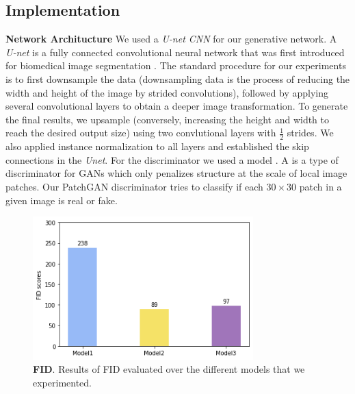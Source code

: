 \documentclass[10pt,twocolumn,letterpaper]{article}
\begin{document}
\subsection{Implementation}
\textbf{Network Architucture} We used a \textit{U-net CNN} for our generative network. A \textit{U-net} is a fully connected convolutional neural network that was first introduced for biomedical image segmentation \cite{unet}. The standard procedure for our experiments is to first downsample the data (downsampling data is the process of reducing the width and height of the image by strided convolutions), followed by applying several convolutional layers to obtain a deeper image transformation. To generate the final results, we upsample (conversely, increasing the height and width to reach the desired output size) using two convlutional layers with $\frac{1}{2}$ strides. We also applied instance normalization \cite{insnorm} to all layers and established the skip connections in the \textit{Unet}. For the discriminator we used a  model \cite{patchgan}. A is a type of discriminator for GANs which only penalizes structure at the scale of local image patches. Our PatchGAN discriminator tries to classify if each $30 \times 30$ patch in a given image is real or fake.

\begin{figure}
	\includegraphics[width=23em]{fid.png}
	\caption{\textbf{FID}. Results of FID evaluated over the different models that we experimented.}
	\label{figure:fid}
\end{figure}
\end{document}

